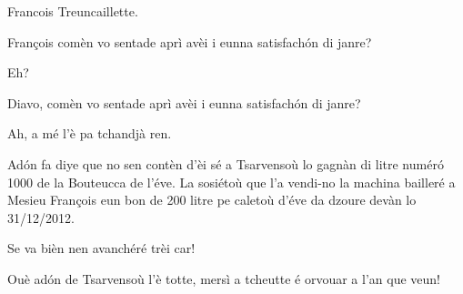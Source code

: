 \begin{drama}
\Francoisspeaks{} Francois Treuncaillette.

\Journalistespeaks François comèn vo sentade aprì avèi i eunna satisfach\'on di janre?

\Francoisspeaks Eh?

\Journalistespeaks Diavo, comèn vo sentade aprì avèi i eunna satisfach\'on di janre?

\Francoisspeaks Ah, a mé l’è pa tchandjà ren.


\Seunteuccospeaks Ad\'on fa diye que no sen contèn d'èi sé a Tsarvensoù lo gagnàn di litre num\'er\'o 1000 de la Bouteucca de l'éve. La sosiétoù que l’a vendi-no la machina bailleré a Mesieu François eun bon de 200 litre pe caletoù d'éve da dzoure devàn lo 31/12/2012.


\Prosperospeaks Se va bièn nen avanchéré trèi car!

\Journalistespeaks Ouè ad\'on de Tsarvensoù l'è totte, mersì a tcheutte é orvouar a l'an que veun!

\ridocliou

\DeriLeRido
{}

\end{drama}



